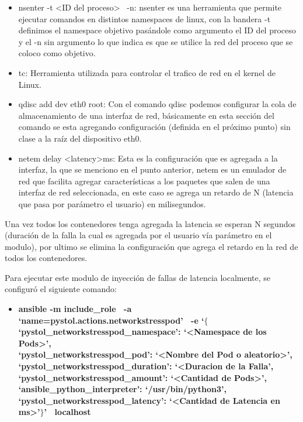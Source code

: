 \begin{itemize}
        \item nsenter -t <ID del proceso> \ -n: nsenter es una herramienta que permite ejecutar comandos en distintos namespaces de linux, con la bandera -t definimos el namespace objetivo pasándole como argumento el ID del proceso y el -n sin argumento lo que indica es que se utilice la red del proceso que se coloco como objetivo.
        \item tc: Herramienta utilizada para controlar el trafico de red en el kernel de Linux.
        \item qdisc add dev eth0 root: Con el comando qdisc podemos configurar la cola de almacenamiento de una interfaz de red, básicamente en esta sección del comando se esta agregando configuración (definida en el próximo punto) sin clase a la raíz del dispositivo eth0.
        \item netem delay <latency>ms: Esta es la configuración que es agregada a la interfaz, la que se menciono en el punto anterior, netem es un emulador de red que facilita agregar características a los paquetes que salen de una interfaz de red seleccionada, en este caso se agrega un retardo de N (latencia que pasa por parámetro el usuario) en milisegundos.\\
    \end{itemize}
    
\par Una vez todos los contenedores tenga agregada la latencia se esperan N segundos (duración de la falla la cual es agregada por el usuario vía parámetro en el modulo), por ultimo se elimina la configuración que agrega el retardo en la red de todos los contenedores.\\ 

\par Para ejecutar este modulo de inyección de fallas de latencia localmente, se configur\'o el siguiente comando:
\begin{itemize}
    \item \textbf{ansible -m include\_role \ -a `name=pystol.actions.networkstresspod' \ -e `$\{$ \\
    `pystol\_networkstresspod\_namespace': `<Namespace de los Pods>', \\
    `pystol\_networkstresspod\_pod': `<Nombre del Pod o aleatorio>', \\
    `pystol\_networkstresspod\_duration': `<Duracion de la Falla', \\
    `pystol\_networkstresspod\_amount': `<Cantidad de Pods>', \\
    `ansible\_python\_interpreter': `/usr/bin/python3', \\
    `pystol\_networkstresspod\_latency': `<Cantidad de Latencia en ms>'$\}$' \ localhost} %
\end{itemize}

